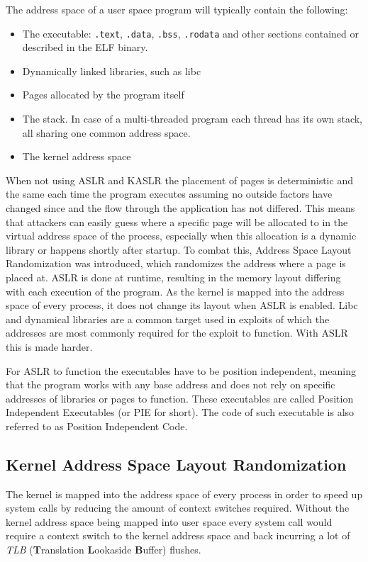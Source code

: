 The address space of a user space program will typically contain the following:

\begin{itemize}
  \item The executable: \lstinline{.text}, \lstinline{.data}, \lstinline{.bss}, \lstinline{.rodata} and other sections contained or described in the ELF binary.
  \item Dynamically linked libraries, such as libc
  \item Pages allocated by the program itself
  \item The stack. In case of a multi-threaded program each thread has its own stack, all sharing one common address space.
  \item The kernel address space
\end{itemize}

When not using ASLR and KASLR the placement of pages is deterministic and the same each time the program executes assuming no outside factors have changed since and the flow through the application has not differed.
This means that attackers can easily guess where a specific page will be allocated to in the virtual address space of the process, especially when this allocation is a dynamic library or happens shortly after startup.
To combat this, Address Space Layout Randomization was introduced, which randomizes the address where a page is placed at.
ASLR is done at runtime, resulting in the memory layout differing with each execution of the program.
As the kernel is mapped into the address space of every process, it does not change its layout when ASLR is enabled.
Libc and dynamical libraries are a common target used in exploits of which the addresses are most commonly required for the exploit to function. With ASLR this is made harder.

For ASLR to function the executables have to be position independent, meaning that the program works with any base address and does not rely on specific addresses of libraries or pages to function.
These executables are called Position Independent Executables (or PIE for short).
The code of such executable is also referred to as Position Independent Code.

\subsection{Kernel Address Space Layout Randomization}

The kernel is mapped into the address space of every process in order to speed up system calls by reducing the amount of context switches required.
Without the kernel address space being mapped into user space every system call would require a context switch to the kernel address space and back incurring a lot of \textit{TLB} (\textbf{T}ranslation \textbf{L}ookaside \textbf{B}uffer) flushes.

